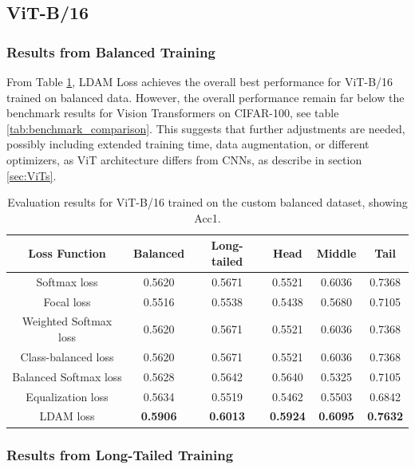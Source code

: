 \subsection{ViT-B/16}

\subsubsection{Results from Balanced Training}

From Table \ref{tab:vit_bal_acc1_1}, LDAM Loss achieves the overall best performance for ViT-B/16 trained on balanced data. However, the overall performance remain far below the benchmark results for Vision Transformers on CIFAR-100, see table \ref{tab:benchmark_comparison}. This suggests that further adjustments are needed, possibly including extended training time, data augmentation, or different optimizers, as ViT architecture differs from CNNs, as describe in section \ref{sec:ViTs}. 

\begin{table}[h!]
    \centering
    \caption{Evaluation results for ViT-B/16 trained on the custom balanced dataset, showing Acc1.}
    \begin{tabular}{cccccc}
        \toprule
        Loss Function & Balanced & Long-tailed & Head & Middle & Tail \\ 
        \midrule
        Softmax loss   & 0.5620 & 0.5671 & 0.5521 & 0.6036 & 0.7368 \\
        Focal loss   & 0.5516 & 0.5538 & 0.5438 & 0.5680 & 0.7105 \\
        Weighted Softmax loss   & 0.5620 & 0.5671 & 0.5521 & 0.6036 & 0.7368 \\
        Class-balanced loss   & 0.5620 & 0.5671 &  0.5521 & 0.6036 & 0.7368 \\
        Balanced Softmax loss   & 0.5628 & 0.5642 & 0.5640 & 0.5325 & 0.7105 \\
        Equalization loss   & 0.5634   & 0.5519 & 0.5462 & 0.5503 & 0.6842 \\
        LDAM loss   & \textbf{0.5906} &  \textbf{0.6013} & \textbf{0.5924} & \textbf{0.6095} & \textbf{0.7632} \\
        \bottomrule
    \end{tabular}
    \label{tab:vit_bal_acc1_1}
\end{table}

\subsubsection{Results from Long-Tailed Training}

